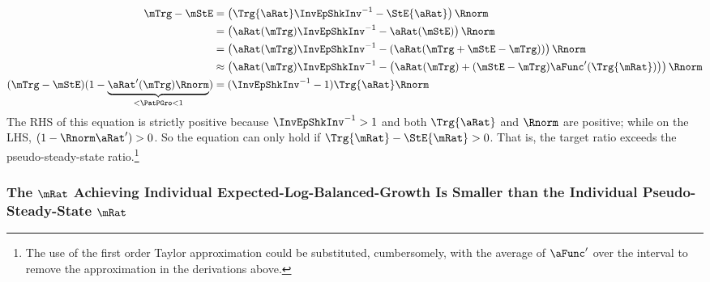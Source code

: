 \documentclass[\econtexRoot/BufferStockTheory]{subfiles}
\begin{document}
\begin{equation}\begin{split}
  \mTrg - \mStE %
 & = \left(\Trg{\aRat} \InvEpShkInv^{-1} - \StE{\aRat} \right)\Rnorm 
\\ & = \left({\aRat}(\mTrg) \InvEpShkInv^{-1} - {\aRat}(\mStE) \right)\Rnorm 
\\ & = \left({\aRat}(\mTrg) \InvEpShkInv^{-1} - \left({\aRat}(\mTrg+\mStE-\mTrg)\right) \right)\Rnorm 
\\ & \approx \left({\aRat}(\mTrg) \InvEpShkInv^{-1} - \left({\aRat}(\mTrg)+(\mStE-\mTrg)\aFunc^{\prime}(\Trg{\mRat})\right) \right)\Rnorm 
  \\ (\mTrg - \mStE)(1-\underbrace{{\aRat}^{\prime}(\mTrg)\Rnorm}_{< \PatPGro < 1}) & = (\InvEpShkInv^{-1} - 1)\Trg{\aRat}\Rnorm
\end{split}\end{equation}
The RHS of this equation is strictly positive because $\InvEpShkInv^{-1}>1$ and both $\Trg{\aRat}$ and $\Rnorm$ are positive; while on the LHS, $(1-\Rnorm\aRat^{\prime})>0$.  So the equation can only hold if $\Trg{\mRat}-\StE{\mRat} > 0$.  That is, the target ratio exceeds the pseudo-steady-state ratio.\footnote{The use of the first order Taylor approximation could be substituted, cumbersomely, with the average of $\aFunc^{\prime}$ over the interval to remove the approximation in the derivations above.}

\subsubsection{The \texorpdfstring{$\mRat$}{m}  Achieving Individual Expected-Log-Balanced-Growth Is Smaller than the Individual Pseudo-Steady-State \texorpdfstring{$\mRat$}{m}}
\end{document}
